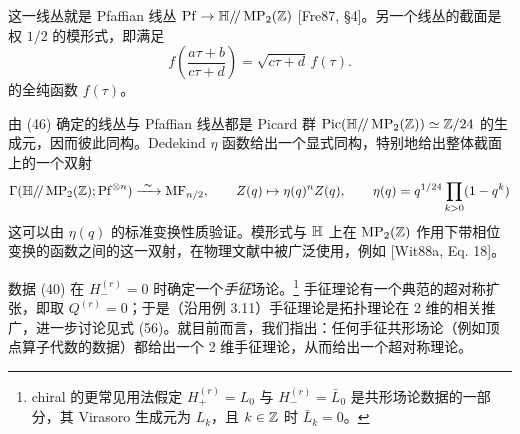 
这一线丛就是 Pfaffian 线丛 $\mathrm{Pf}\to\mathbb{H}/\!/\operatorname{MP}_2(\mathbb{Z})$ [Fre87, §4]。另一个线丛的截面是权 $1/2$ 的模形式，即满足
\begin{equation}
f\left(\frac{a\tau+b}{c\tau+d}\right)=\sqrt{c\tau+d}\,f(\tau).
\tag{46}
\end{equation}
的全纯函数 $f(\tau)$。

由 (46) 确定的线丛与 Pfaffian 线丛都是 Picard 群 $\mathrm{Pic}(\mathbb{H}/\!/\operatorname{MP}_2(\mathbb{Z}))\simeq\mathbb{Z}/24$ 的生成元，因而彼此同构。Dedekind $\eta$ 函数给出一个显式同构，特别地给出整体截面上的一个双射
\[
\Gamma(\mathbb{H}/\!/\operatorname{MP}_2(\mathbb{Z});\mathrm{Pf}^{\otimes n})\xrightarrow{\ \sim\ }\mathrm{MF}_{n/2},\qquad Z(q)\mapsto\eta(q)^n Z(q),\qquad \eta(q)=q^{1/24}\prod_{k>0}(1-q^k)
\]
这可以由 $\eta(q)$ 的标准变换性质验证。模形式与 $\mathbb{H}$ 上在 $\operatorname{MP}_2(\mathbb{Z})$ 作用下带相位变换的函数之间的这一双射，在物理文献中被广泛使用，例如 [Wit88a, Eq. 18]。


\begin{example}[4.2（手征理论）]
数据 (40) 在 $H^{(r)}_-=0$ 时确定一个\emph{手征}场论。\footnote{chiral 的更常见用法假定 $H^{(r)}_+=L_0$ 与 $H^{(r)}_-=\bar L_0$ 是共形场论数据的一部分，其 Virasoro 生成元为 $L_k$，且 $k\in\mathbb{Z}$ 时 $\bar L_k=0$。} 手征理论有一个典范的超对称扩张，即取 $Q^{(r)}=0$；于是（沿用例 3.11）手征理论是拓扑理论在 2 维的相关推广，进一步讨论见式 (56)。就目前而言，我们指出：任何手征共形场论（例如顶点算子代数的数据）都给出一个 2 维手征理论，从而给出一个超对称理论。
\end{example}


